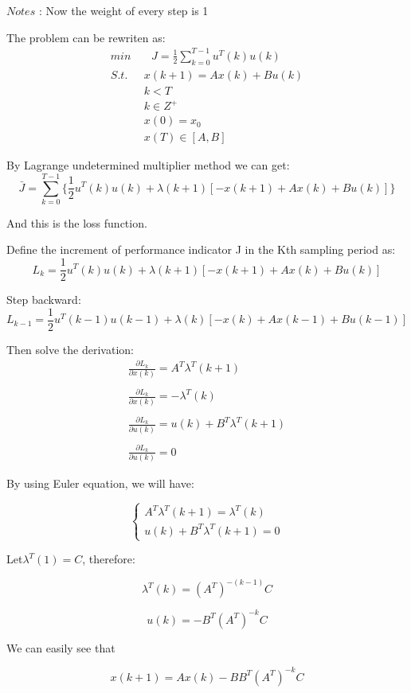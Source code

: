 \documentclass{mcmthesis}
\begin{document}
$Notes$ : Now the weight of every step is 1

The problem can be rewriten as:
\begin{align}
min & \text{ } J=\frac{1}{2}\sum^{T-1}_{k=0}u^T(k)u(k)\\
S.t. \text{ }& x(k+1)=A x(k)+B u(k)\\ &  k < T\\& k \in Z^+ \\&x(0)=x_0\\&x(T)∈  [A,B]
\end{align}

By Lagrange undetermined multiplier method we can get:
$$\bar J=\sum^{T-1}_{k=0}\{\frac{1}{2}u^T(k)u(k)+\lambda(k+1)[-x(k+1)+Ax(k)+Bu(k)]\}$$

And this is the loss function.

Define the increment of performance indicator J in the Kth sampling period as:
$$L_k=\frac{1}{2}u^T(k)u(k)+\lambda(k+1)[-x(k+1)+Ax(k)+Bu(k)]$$

Step backward:
$$L_{k-1}=\frac{1}{2}u^T(k-1)u(k-1)+\lambda(k)[-x(k)+Ax(k-1)+Bu(k-1)]$$

Then solve the  derivation:
\begin{equation}\begin{array}{l}
\frac{\partial L_{k}}{\partial x(k)}=A^{T} \lambda^{T}(k+1) \\\\
\frac{\partial L_{k}}{\partial x(k)}=-\lambda^{T}(k) \\\\
\frac{\partial L_{k}}{\partial u(k)}=u(k)+B^{T} \lambda^{T}(k+1) \\\\
\frac{\partial L_{k}}{\partial u(k)}=0
\end{array}\end{equation}

By using Euler equation, we will have:

$$\begin{cases} A^T\lambda^T(k+1) =\lambda^T(k) \\u(k)+B^T\lambda^T(k+1)=0 \end{cases}$$

Let$\lambda^T(1)=C$, therefore:

 $$\lambda^T(k)=(A^T)^{-(k-1)}C$$

$$u(k)=-B^T(A^T)^{-k}C$$

We can easily see that

$$x(k+1)=Ax(k)-BB^T(A^T)^{-k}C$$
\end{document}
